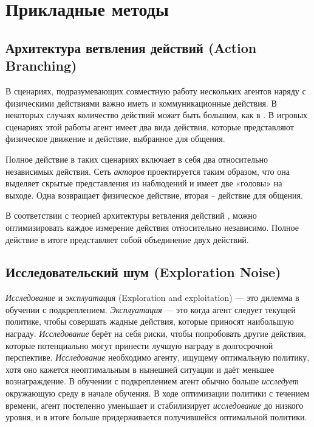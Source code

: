 \section{Прикладные методы}

\subsection{Архитектура ветвления действий (Action Branching)}

В сценариях, подразумевающих совместную работу нескольких агентов наряду с физическими действиями важно иметь и коммуникационные действия. В некоторых случаях количество действий может быть большим, как в \cite{tavakoli2017action}. В игровых сценариях этой работы агент имеет два вида действия, которые представляют физическое движение и действие, выбранное для общения.

Полное действие в таких сценариях включает в себя два относительно независимых действия. Сеть \textit{акторов} проектируется таким образом, что она выделяет скрытые представления из наблюдений и имеет две «головы» на выходе. Одна возвращает физическое действие, вторая – действие для общения.

В соответствии с теорией архитектуры ветвления действий \cite{tavakoli2017action}, можно оптимизировать каждое измерение действия относительно независимо. Полное действие в итоге представляет собой объединение двух действий.

\subsection{Исследовательский шум (Exploration Noise)}

\textit{Исследование} и \textit{эксплуатация} (Exploration and exploitation) — это дилемма в обучении с подкреплением. \textit{Эксплуатация} — это когда агент следует текущей политике, чтобы совершать жадные действия, которые приносят наибольшую награду. \textit{Исследование} берёт на себя риски, чтобы попробовать другие действия, которые потенциально могут принести лучшую награду в долгосрочной перспективе. \textit{Исследование} необходимо агенту, ищущему оптимальную политику, хотя оно кажется неоптимальным в нынешней ситуации и даёт меньшее вознаграждение. В обучении с подкреплением агент обычно больше \textit{исследует} окружающую среду в начале обучения. В ходе оптимизации политики с течением времени, агент постепенно уменьшает и стабилизирует \textit{исследование} до низкого уровня, и в итоге больше придерживается получившейся оптимальной политики.

